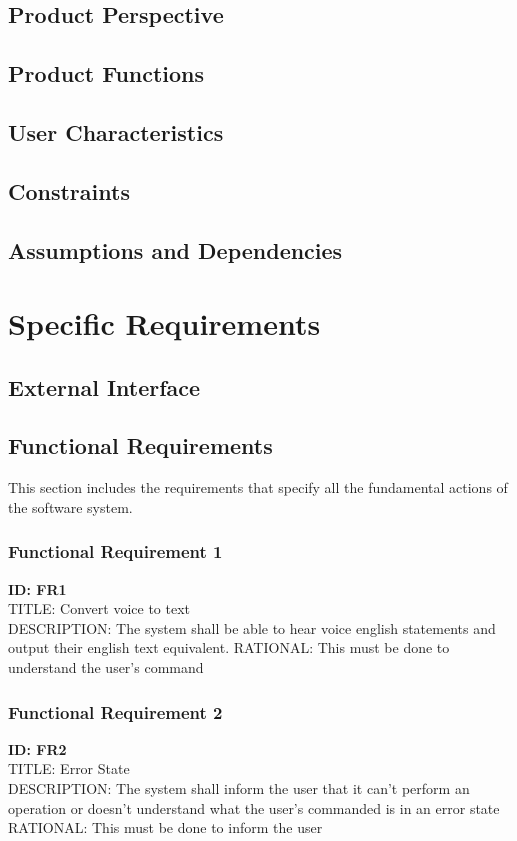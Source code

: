 \documentclass[onecolumn, draftclsnofoot,10pt, compsoc]{IEEEtran}
\begin{document}
    \subsection{Product Perspective}
        
    \subsection{Product Functions}
    \subsection{User Characteristics}
    \subsection{Constraints}
    \subsection{Assumptions and Dependencies}


\section{Specific Requirements}
    \subsection{External Interface}
    \subsection{Functional Requirements}
    This section includes the requirements that specify all the fundamental actions of the software system.
    	\subsubsection{Functional Requirement 1}
    	\textbf{ID: FR1} \\
        TITLE: Convert voice to text \\
        DESCRIPTION: The system shall be able to hear voice english statements and output their english text equivalent.
        RATIONAL: This must be done to understand the user's command 
        
        \subsubsection{Functional Requirement 2}
    	\textbf{ID: FR2} \\
        TITLE: Error State \\
        DESCRIPTION: The system shall inform the user that it can't perform an operation or doesn't understand what the user's commanded is in an error state \\
        RATIONAL: This must be done to inform the user 
        
\end{document}
